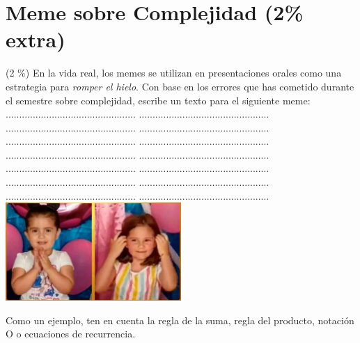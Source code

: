 \documentclass[10 pt]{article}
\begin{document}
\newpage

\section{Meme sobre Complejidad (2\% extra)}
 (2 \%)  En la vida real, los memes se utilizan en presentaciones orales como una estrategia para \textit{romper el hielo}. Con base en los errores que has cometido durante el semestre sobre complejidad, 
escribe un texto para el siguiente meme:\\
................................................     ................................................\\
................................................     ................................................\\
................................................     ................................................\\
................................................     ................................................\\
................................................     ................................................\\
................................................     ................................................\\
................................................     ................................................\\
\includegraphics[width=0.5\textwidth]{Meme.jpg}


Como un ejemplo, ten en cuenta la regla de la suma, regla del producto,
notación O o ecuaciones de recurrencia.



\newpage
\end{document}
